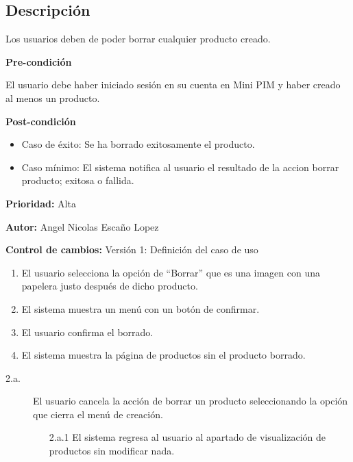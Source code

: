 {}

\subsection*{Descripción}
Los usuarios deben de poder borrar cualquier producto creado.
\par
\vspace{0.15cm}

\textbf{Pre-condición}\par
El usuario debe haber iniciado sesión en su cuenta en Mini PIM y haber creado al menos un producto.\par
\vspace{0.15cm}

\textbf{Post-condición}
\begin{itemize}
    \item Caso de éxito: Se ha borrado exitosamente el producto.
    \item Caso mínimo: El sistema notifica al usuario el resultado de la accion borrar producto; exitosa o fallida.
\end{itemize}

\textbf{Prioridad: }
Alta
\vspace{0.15cm}

\textbf{Autor: }
Angel Nicolas Escaño Lopez\par
\vspace{0.15cm}

\textbf{Control de cambios: } Versión 1: Definición del caso de uso

\begin{enumerate}
    \item El usuario selecciona la opción de “Borrar” que es una imagen con una papelera justo después de dicho producto.
    \item El sistema muestra un menú con un botón de confirmar.
    \item El usuario confirma el borrado.
    \item El sistema muestra la página de productos sin el producto borrado.
\end{enumerate}

\begin{description}
    \item[2.a.] El usuario cancela la acción de borrar un producto seleccionando la opción que cierra el menú de creación.
    \begin{enumerate}
        \item[2.a.1] El sistema regresa al usuario al apartado de visualización de productos sin modificar nada.
    \end{enumerate}
\end{description}

